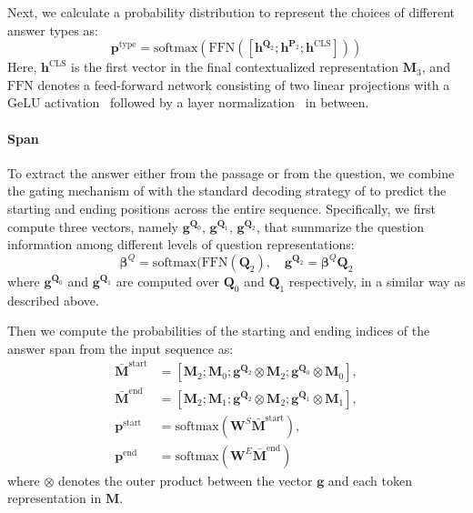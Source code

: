 \documentclass[11pt,a4paper]{article}
\begin{document}
Next, we calculate a probability distribution to represent the choices of different answer types as:
\begin{equation}
	\mathbf{p}^{\mathrm{type}} = \mathrm{softmax}(\mathrm{FFN}([\mathbf{h}^{\mathbf{Q}_2}; \mathbf{h}^{\mathbf{P}_2}; \mathbf{h}^{\mathrm{CLS}}])) \nonumber
\end{equation}
Here, $\mathbf{h}^{\mathrm{CLS}}$ is the first vector in the final contextualized representation $\mathbf{M}_3$, and $\mathrm{FFN}$ denotes a feed-forward network consisting of two linear projections with a GeLU activation~\cite{hendrycks2016bridging} followed by a layer normalization~\cite{lei2016layer} in between.

\paragraph{Span}
To extract the answer either from the passage or from the question, we combine the gating mechanism of \citet{wang2017gated} with the standard decoding strategy of \citet{seo2016bidirectional} to predict the starting and ending positions across the entire sequence.
Specifically, we first compute three vectors, namely $\mathbf{g}^{\mathbf{Q}_0}$, $\mathbf{g}^{\mathbf{Q}_1}$, $\mathbf{g}^{\mathbf{Q}_2}$, that summarize the question information among different levels of question representations:
\begin{equation}
	\boldsymbol{\beta}^Q = \mathrm{softmax}(\mathrm{FFN}(\mathbf{Q}_2), \quad \mathbf{g}^{\mathbf{Q}_2} = \boldsymbol{\beta}^Q \mathbf{Q}_2 \nonumber
\end{equation}
where $\mathbf{g}^{\mathbf{Q}_0}$ and $\mathbf{g}^{\mathbf{Q}_1}$ are computed over $\mathbf{Q}_0$ and $\mathbf{Q}_1$ respectively, in a similar way as described above.

Then we compute the probabilities of the starting and ending indices of the answer span from the input sequence as:
\begin{align}
	\bar{\mathbf{M}}^\mathrm{start} &= [\mathbf{M}_2;\mathbf{M}_0; \mathbf{g}^{\mathbf{Q}_2} \otimes \mathbf{M}_2; \mathbf{g}^{\mathbf{Q}_0} \otimes \mathbf{M}_0], \nonumber \\
	\bar{\mathbf{M}}^\mathrm{end} &= [\mathbf{M}_2;\mathbf{M}_1; \mathbf{g}^{\mathbf{Q}_2} \otimes \mathbf{M}_2; \mathbf{g}^{\mathbf{Q}_1} \otimes \mathbf{M}_1], \nonumber \\ 
    \mathbf{p}^\mathrm{start} &= \mathrm{softmax}(\mathbf{W}^S \bar{\mathbf{M}}^\mathrm{start}), \nonumber \\ 
    \mathbf{p}^\mathrm{end} &= \mathrm{softmax}(\mathbf{W}^E \bar{\mathbf{M}}^\mathrm{end}) \nonumber
\end{align}
where $\otimes$ denotes the outer product between the vector $\mathbf{g}$ and each token representation in $\mathbf{M}$.
\end{document}
